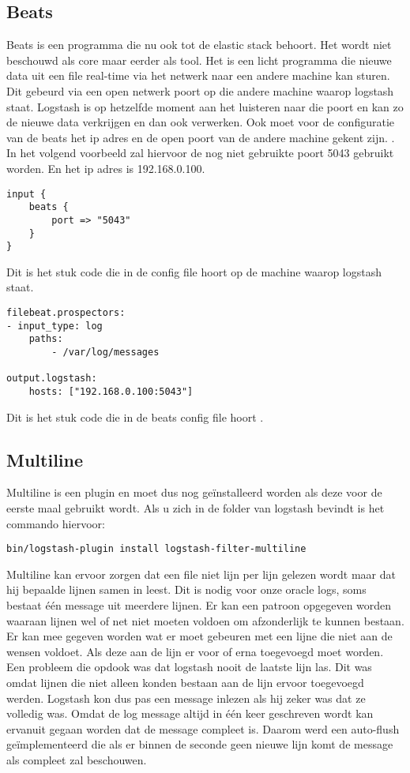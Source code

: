 \subsection{Beats}
\label{subsec:beats}

Beats is een programma die nu ook tot de elastic stack behoort. Het wordt niet beschouwd als core maar eerder als tool. Het is een licht programma die nieuwe data uit een file real-time via het netwerk naar een andere machine kan sturen. Dit gebeurd via een open netwerk poort op die andere machine waarop logstash staat. Logstash is op hetzelfde moment aan het luisteren naar die poort en kan zo de nieuwe data verkrijgen en dan ook verwerken.
Ook moet voor de configuratie van de beats het ip adres en de open poort van de andere machine gekent zijn. . In het volgend voorbeeld zal hiervoor de nog niet gebruikte poort  5043 gebruikt worden. En het ip adres is 192.168.0.100.
\begin{lstlisting}[frame=single]  
input {
	beats {
		port => "5043"
	}
}

\end{lstlisting}
Dit is het stuk code die in de config file hoort op de machine waarop logstash staat.
\begin{lstlisting}[frame=single]  
filebeat.prospectors:
- input_type: log
	paths:
		- /var/log/messages 
		
output.logstash:
	hosts: ["192.168.0.100:5043"]
\end{lstlisting}
Dit is het stuk code die in de beats config file hoort .


\subsection{Multiline}
\label{subsec:multiline}

Multiline is een plugin en moet dus nog geïnstalleerd worden als deze voor de eerste maal gebruikt wordt. Als u zich in de folder van logstash bevindt is het commando hiervoor:

\begin{lstlisting}[frame=single]  
bin/logstash-plugin install logstash-filter-multiline
\end{lstlisting}

Multiline kan ervoor zorgen dat een file niet lijn per lijn gelezen wordt maar dat hij bepaalde lijnen samen in leest. Dit is nodig voor onze oracle logs, soms bestaat één message uit meerdere lijnen.
Er kan een patroon opgegeven worden waaraan lijnen wel of net niet moeten voldoen om afzonderlijk te kunnen bestaan. Er kan mee gegeven worden wat er moet gebeuren met een lijne die niet aan de wensen voldoet. Als deze aan de lijn er voor of erna toegevoegd moet worden. 
Een probleem die opdook was dat logstash nooit de laatste lijn las. Dit was omdat lijnen die niet alleen konden bestaan aan de lijn ervoor toegevoegd werden. Logstash kon dus pas een message inlezen als hij zeker was dat ze volledig was. Omdat de log message altijd in één keer geschreven wordt kan ervanuit gegaan worden dat de message compleet is. Daarom werd een auto-flush geïmplementeerd die als er binnen de seconde geen nieuwe lijn komt de message als compleet zal beschouwen.

